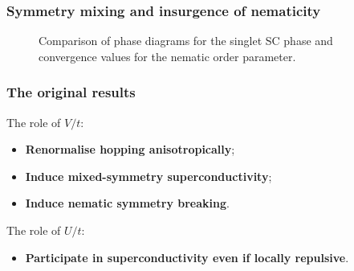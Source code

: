 %	
%	

\begin{frame}
	\frametitle{Symmetry mixing and insurgence of nematicity}
	
	\begin{figure}
		\centering
		
		\caption{Comparison of phase diagrams for the singlet SC phase and convergence values for the nematic order parameter.}
	\end{figure}
	
\end{frame}

\begin{frame}
	\frametitle{The original results}
	The role of $V/t$:
	\begin{itemize}
		\item \textbf{Renormalise hopping anisotropically};
		\item \textbf{Induce mixed-symmetry superconductivity};
		\item \textbf{Induce nematic symmetry breaking}.
	\end{itemize}
	The role of $U/t$:
	\begin{itemize}
		\item \textbf{Participate in superconductivity even if locally repulsive}.
	\end{itemize}
\end{frame}